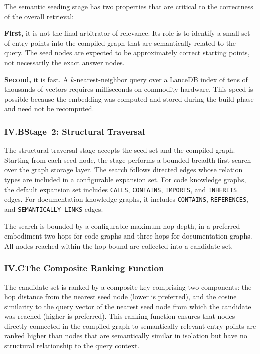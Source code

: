 \documentclass[12pt]{article}
\begin{document}
The semantic seeding stage has two properties that are critical to the correctness
of the overall retrieval:

\textbf{First,} it is not the final arbitrator of relevance. Its role is to
identify a small set of entry points into the compiled graph that are
semantically related to the query. The seed nodes are expected to be
approximately correct starting points, not necessarily the exact answer nodes.

\textbf{Second,} it is fast. A $k$-nearest-neighbor query over a LanceDB index of
tens of thousands of vectors requires milliseconds on commodity hardware. This
speed is possible because the embedding was computed and stored during the build
phase and need not be recomputed.

\subsubsection{IV.B\quad Stage~2: Structural Traversal}

The structural traversal stage accepts the seed set and the compiled graph.
Starting from each seed node, the stage performs a bounded breadth-first search
over the graph storage layer. The search follows directed edges whose relation
types are included in a configurable expansion set. For code knowledge graphs,
the default expansion set includes \texttt{CALLS}, \texttt{CONTAINS},
\texttt{IMPORTS}, and \texttt{INHERITS} edges. For documentation knowledge
graphs, it includes \texttt{CONTAINS}, \texttt{REFERENCES}, and
\texttt{SEMANTICALLY\_LINKS} edges.

The search is bounded by a configurable maximum hop depth, in a preferred
embodiment two hops for code graphs and three hops for documentation graphs. All
nodes reached within the hop bound are collected into a candidate set.

\subsubsection{IV.C\quad The Composite Ranking Function}

The candidate set is ranked by a composite key comprising two components: the hop
distance from the nearest seed node (lower is preferred), and the cosine
similarity to the query vector of the nearest seed node from which the candidate
was reached (higher is preferred). This ranking function ensures that nodes
directly connected in the compiled graph to semantically relevant entry points
are ranked higher than nodes that are semantically similar in isolation but have
no structural relationship to the query context.
\end{document}
